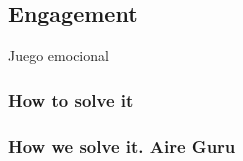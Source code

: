 \subsection{Engagement}
 
Juego emocional



\subsubsection{How to solve it} 


\subsubsection{How we solve it. Aire Guru} 
 
\begin{itemize}
    \done
    \crossed
    
\end{itemize}
\newpage
